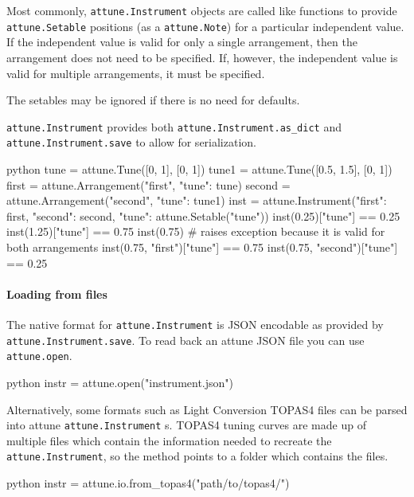 Most commonly, \texttt{attune.Instrument} objects are
called like functions to provide
\texttt{attune.Setable} positions (as a
\texttt{attune.Note}) for a particular independent
value. If the independent value is valid for only a single arrangement,
then the arrangement does not need to be specified. If, however, the
independent value is valid for multiple arrangements, it must be
specified.

The setables may be ignored if there is no need for defaults.

\texttt{attune.Instrument} provides both
\texttt{attune.Instrument.as\_dict} and
\texttt{attune.Instrument.save} to allow for
serialization.

\begin{codefragment}{python}
tune = attune.Tune([0, 1], [0, 1])
tune1 = attune.Tune([0.5, 1.5], [0, 1])
first = attune.Arrangement("first", {"tune": tune})
second = attune.Arrangement("second", {"tune": tune1})
inst = attune.Instrument({"first": first, "second": second}, {"tune": attune.Setable("tune")})
inst(0.25)["tune"] == 0.25
inst(1.25)["tune"] == 0.75
inst(0.75) # raises exception because it is valid for both arrangements
inst(0.75, "first")["tune"] == 0.75
inst(0.75, "second")["tune"] == 0.25
\end{codefragment}

\hypertarget{loading-from-files}{%
\paragraph{Loading from files}\label{loading-from-files}}

The native format for \texttt{attune.Instrument} is
JSON encodable as provided by
\texttt{attune.Instrument.save}. To read back an attune
JSON file you can use \texttt{attune.open}.

\begin{codefragment}{python}
instr = attune.open("instrument.json")
\end{codefragment}

Alternatively, some formats such as Light Conversion TOPAS4 files can be
parsed into attune \texttt{attune.Instrument} s. TOPAS4
tuning curves are made up of multiple files which contain the
information needed to recreate the
\texttt{attune.Instrument}, so the method points to a
folder which contains the files.

\begin{codefragment}{python}
instr = attune.io.from_topas4("path/to/topas4/")
\end{codefragment}

